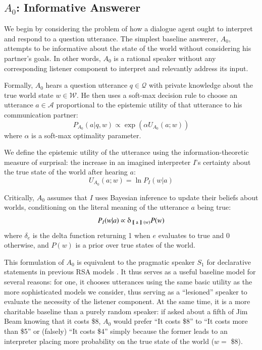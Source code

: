 \documentclass[11pt, floatsintext]{apa6}
\newcommand{\den}[2][]{
\(
\left\llbracket\;\text{#2}\;\right\rrbracket^{#1}
\)
}
\newcommand{\ndg}[1]{\textcolor{Green}{[ndg: #1]}}
\begin{document}

\subsection{$A_0$: Informative Answerer}

We begin by considering the problem of how a dialogue agent ought to interpret and respond to a question utterance. The simplest baseline answerer, $A_0$, attempts to be informative about the state of the world without considering his partner's goals. In other words, $A_0$ is a rational speaker without any corresponding listener component to interpret and relevantly address its input. 

Formally, $A_0$ hears a question utterance $q \in \mathcal{Q}$ with private knowledge about the true world state $w \in \mathcal{W}$. He then uses a soft-max decision rule to choose an utterance $a \in \mathcal{A}$ proportional to the epistemic utility of that utterance to his communication partner: 
$$P_{A_0}(a | q, w) \propto \exp(\alpha U_{A_0}(a;w))$$ 
where $\alpha$ is a soft-max optimality parameter. 

We define the epistemic utility of the utterance using the information-theoretic measure of surprisal: the increase in an imagined interpreter $I$'s certainty about the true state of the world after hearing $a$: 
\begin{equation}
\label{eq:A0utility}
U_{A_0}(a;w) = \ln P_I(w|a)
\end{equation}

Critically, $A_0$ assumes that $I$ uses Bayesian inference to update their beliefs about worlds, conditioning on the literal meaning of the utterance $a$ being true:
$$P_I(w|a) \propto \delta_{\textrm{\den{a}}(w)} P(w)$$
where $\delta_{e}$ is the delta function returning 1 when $e$ evaluates to true and 0 otherwise, and $P(w)$ is a prior over true states of the world. 

This formulation of $A_0$ is equivalent to the pragmatic speaker $S_1$ for declarative statements in previous RSA models \cite{GoodmanFrank16_RSATiCS}. It thus serves as a useful baseline model for several reasons: for one, it chooses utterances using the same basic utility as the more sophisticated models we consider, thus serving as a ``lesioned'' speaker to evaluate the necessity of the listener component. At the same time, it is a more charitable baseline than a purely random speaker: if asked about a fifth of Jim Beam knowing that it costs \$8, $A_0$ would prefer ``It costs \$8'' to ``It costs more than \$5'' or (falsely) ``It costs \$4'' simply because the former leads to an interpreter placing more probability on the true state of the world ($w = $ \$8).
\end{document}
